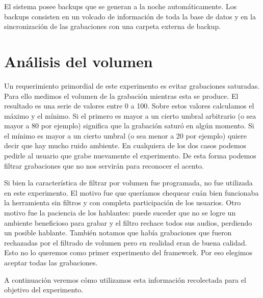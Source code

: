 El sistema posee backups que se generan a la noche automáticamente. Los backups consisten en un volcado de información de toda la base de datos y en la sincronización de las grabaciones con una carpeta externa de backup.

\section{Análisis del volumen}

Un requerimiento primordial de este experimento es evitar grabaciones saturadas. Para ello medimos el volumen de la grabación mientras esta se produce. El resultado es una serie de valores entre 0 a 100. Sobre estos valores calculamos el máximo y el mínimo. Si el primero es mayor a un cierto umbral arbitrario (o sea mayor a 80 por ejemplo) significa que la grabación saturó en algún momento. Si el mínimo es mayor a un cierto umbral (o sea menor a 20 por ejemplo) quiere decir que hay mucho ruido ambiente. En cualquiera de los dos casos podemos pedirle al usuario que grabe nuevamente el experimento. De esta forma podemos filtrar grabaciones que no nos servirán para reconocer el acento.

Si bien la característica de filtrar por volumen fue programada, no fue utilizada en este experimento. El motivo fue que queríamos chequear cuán bien funcionaba la herramienta sin filtros y con completa participación de los usuarios. Otro motivo fue la paciencia de los hablantes: puede suceder que no se logre un ambiente beneficioso para grabar y el filtro rechace todos sus audios, perdiendo un posible hablante. También notamos que había grabaciones que fueron rechazadas por el filtrado de volumen pero en realidad eran de buena calidad. Esto no lo queremos como primer experimento del framework. Por eso elegimos aceptar todas las grabaciones.

A continuación veremos cómo utilizamos esta información recolectada para el objetivo del experimento.